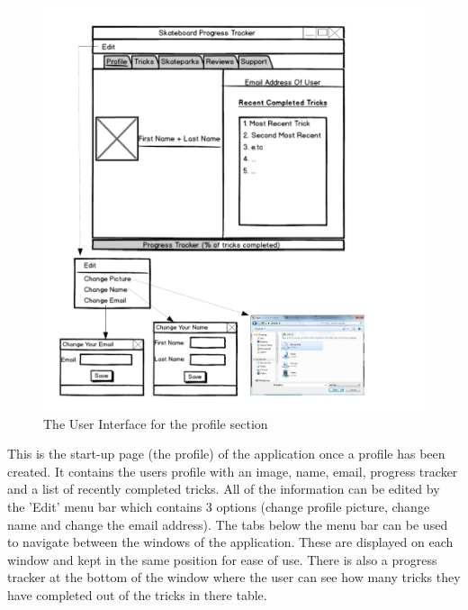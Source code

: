 \begin{figure}[H]
    \includegraphics[width=\textwidth]{./Design/ProfileUI.pdf}
    \caption{The User Interface for the profile section} \label{fig:Profile User Interface}
\end{figure}


This is the start-up page (the profile) of the application once a profile has been created. It contains the users profile with an image, name, email, progress tracker and a list of recently completed tricks. All of the information can be edited by the 'Edit' menu bar which contains 3 options (change profile picture, change name and change the email address). The tabs below the menu bar can be used to navigate between the windows of the application. These are displayed on each window and kept in the same position for ease of use. There is also a progress tracker at the bottom of the window where the user can see how many tricks they have completed out of the tricks in there table.


